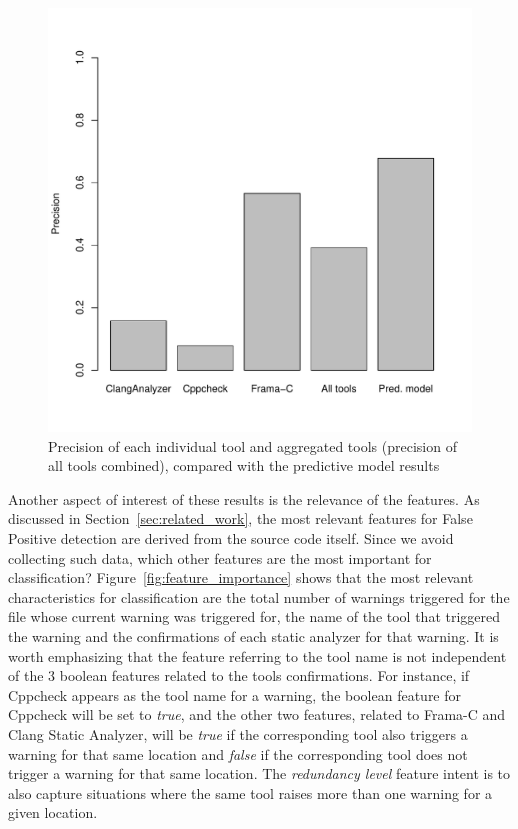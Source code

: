 \begin{figure}
\centering
\includegraphics[width=.75\textwidth]{figures/precisions.pdf}
  \caption{Precision of each individual tool and aggregated tools (precision of all tools combined), compared with the predictive model results}\label{fig:precisions}
\end{figure}

Another aspect of interest of these results is the relevance of the features.
As discussed in Section~\ref{sec:related_work}, the most relevant features for
False Positive detection are derived from the source code itself. Since we
avoid collecting such data, which other features are the most important for
classification?  Figure~\ref{fig:feature_importance} shows that the most
relevant characteristics for classification are the total number of warnings
triggered for the file whose current warning was triggered for, the name of the
tool that triggered the warning and the confirmations of each static analyzer
for that warning. It is worth emphasizing that the feature referring to the
tool name is not independent of the 3 boolean features related to the tools
confirmations. For instance, if Cppcheck appears as the tool name for a warning,
the boolean feature for Cppcheck will be set to \emph{true}, and the other two
features, related to Frama-C and Clang Static Analyzer, will be \emph{true} if
the corresponding tool also triggers a warning for that same location and
\emph{false} if the corresponding tool does not trigger a warning for that same
location. The \emph{redundancy level} feature intent is to also capture
situations where the same tool raises more than one warning for a given
location.

